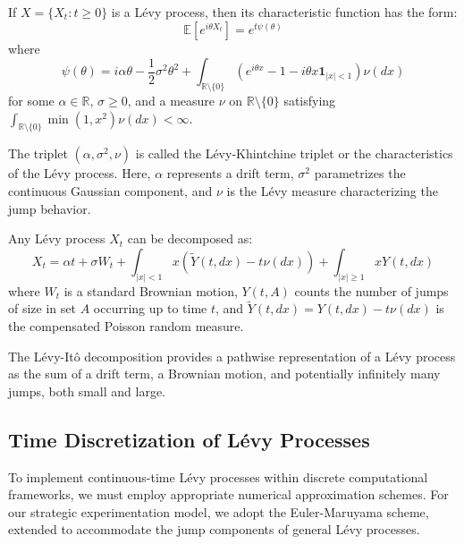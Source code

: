 \begin{theorem}
    If $X = \{X_t : t \geq 0\}$ is a Lévy process, then its characteristic function has the form:
    \begin{equation}
        \mathbb{E}[e^{i\theta X_t}] = e^{t\psi(\theta)}
    \end{equation}
    where
    \begin{equation}
        \psi(\theta) = i\alpha\theta - \frac{1}{2}\sigma^2\theta^2 + \int_{\mathbb{R}\setminus\{0\}} (e^{i\theta x} - 1 - i\theta x\mathbf{1}_{|x|<1})\nu(dx)
    \end{equation}
    for some $\alpha \in \mathbb{R}$, $\sigma \geq 0$, and a measure $\nu$ on $\mathbb{R}\setminus\{0\}$ satisfying $\int_{\mathbb{R}\setminus\{0\}} \min(1, x^2)\nu(dx) < \infty$.
\end{theorem}

The triplet $(\alpha, \sigma^2, \nu)$ is called the Lévy-Khintchine triplet or the characteristics of the Lévy process. Here, $\alpha$ represents a drift term, $\sigma^2$ parametrizes the continuous Gaussian component, and $\nu$ is the Lévy measure characterizing the jump behavior.

\begin{theorem}
    Any Lévy process $X_t$ can be decomposed as:
    \begin{equation}
        X_t = \alpha t + \sigma W_t + \int_{|x|<1} x (\tilde{Y}(t, dx) - t\nu(dx)) + \int_{|x|\geq 1} x Y(t, dx)
    \end{equation}
    where $W_t$ is a standard Brownian motion, $Y(t, A)$ counts the number of jumps of size in set $A$ occurring up to time $t$, and $\tilde{Y}(t, dx) = Y(t, dx) - t\nu(dx)$ is the compensated Poisson random measure.
\end{theorem}

The Lévy-Itô decomposition provides a pathwise representation of a Lévy process as the sum of a drift term, a Brownian motion, and potentially infinitely many jumps, both small and large.

\subsection{Time Discretization of Lévy Processes}
\label{appendix:levy_discretization_methods}

To implement continuous-time Lévy processes within discrete computational frameworks, we must employ appropriate numerical approximation schemes. For our strategic experimentation model, we adopt the Euler-Maruyama scheme, extended to accommodate the jump components of general Lévy processes.

